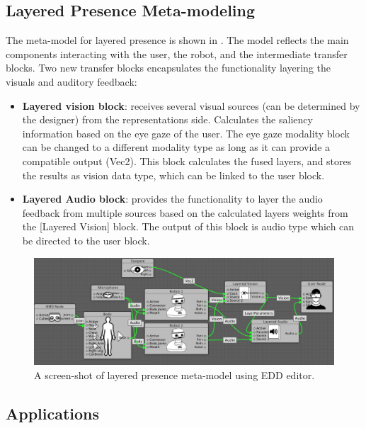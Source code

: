 \subsection{Layered Presence Meta-modeling}

The meta-model for layered presence is shown in . The model reflects the main components interacting with the user, the robot, and the intermediate transfer blocks. Two new transfer blocks encapsulates the functionality layering the visuals and auditory feedback:
\begin{itemize}
\item \textbf{Layered vision block}: receives several visual sources (can be determined by the designer) from the representations side. Calculates the saliency information based on the eye gaze of the user. The eye gaze modality block can be changed to a different modality type as long as it can provide a compatible output (Vec2). This block calculates the fused layers, and stores the results as vision data type, which can be linked to the user block.

\item \textbf{Layered Audio block}: provides the functionality to layer the audio feedback from multiple sources based on the calculated layers weights from the [Layered Vision] block. The output of this block is audio type which can be directed to the user block.
\end{itemize}


\begin{figure}[t!]
  \centering
  \captionsetup{justification=centering}
  \includegraphics[width=1\linewidth]{figures/eval/Layered/LayeredMetaModel.png}
  \caption{A screen-shot of layered presence meta-model using EDD editor.}
  \label{fig:eval-LP-metamodel}
\end{figure}

\subsection{Applications}

